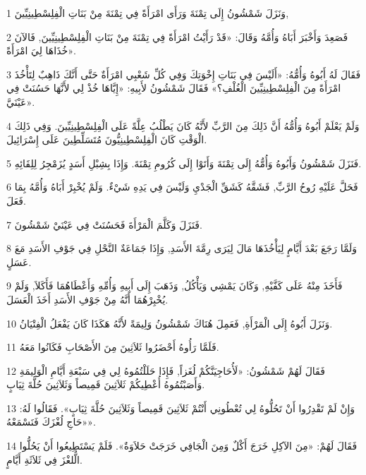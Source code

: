 \par 1 وَنَزَلَ شَمْشُونُ إِلَى تِمْنَةَ وَرَأَى امْرَأَةً فِي تِمْنَةَ مِنْ بَنَاتِ الْفِلِسْطِينِيِّينَ,
\par 2 فَصَعِدَ وَأَخْبَرَ أَبَاهُ وَأُمَّهُ وَقَالَ: «قَدْ رَأَيْتُ امْرَأَةً فِي تِمْنَةَ مِنْ بَنَاتِ الْفِلِسْطِينِيِّينَ, فَالآنَ خُذَاهَا لِيَ امْرَأَةً».
\par 3 فَقَالَ لَهُ أَبُوهُ وَأُمُّهُ: «أَلَيْسَ فِي بَنَاتِ إِخْوَتِكَ وَفِي كُلِّ شَعْبِي امْرَأَةٌ حَتَّى أَنَّكَ ذَاهِبٌ لِتَأْخُذَ امْرَأَةً مِنَ الْفِلِسْطِينِيِّينَ الْغُلْفِ؟» فَقَالَ شَمْشُونُ لأَبِيهِ: «إِيَّاهَا خُذْ لِي لأَنَّهَا حَسُنَتْ فِي عَيْنَيَّ».
\par 4 وَلَمْ يَعْلَمْ أَبُوهُ وَأُمُّهُ أَنَّ ذَلِكَ مِنَ الرَّبِّ لأَنَّهُ كَانَ يَطْلُبُ عِلَّةً عَلَى الْفِلِسْطِينِيِّينَ. وَفِي ذَلِكَ الْوَقْتِ كَانَ الْفِلِسْطِينِيُّونَ مُتَسَلِّطِينَ عَلَى إِسْرَائِيلَ.
\par 5 فَنَزَلَ شَمْشُونُ وَأَبُوهُ وَأُمُّهُ إِلَى تِمْنَةَ وَأَتَوْا إِلَى كُرُومِ تِمْنَةَ. وَإِذَا بِشِبْلِ أَسَدٍ يُزَمْجِرُ لِلِقَائِهِ.
\par 6 فَحَلَّ عَلَيْهِ رُوحُ الرَّبِّ, فَشَقَّهُ كَشَقِّ الْجَدْيِ وَلَيْسَ فِي يَدِهِ شَيْءٌ. وَلَمْ يُخْبِرْ أَبَاهُ وَأُمَّهُ بِمَا فَعَلَ.
\par 7 فَنَزَلَ وَكَلَّمَ الْمَرْأَةَ فَحَسُنَتْ فِي عَيْنَيْ شَمْشُونَ.
\par 8 وَلَمَّا رَجَعَ بَعْدَ أَيَّامٍ لِيَأْخُذَهَا مَالَ لِيَرَى رِمَّةَ الأَسَدِ, وَإِذَا جَمَاعَةٌ النَّحْلِ فِي جَوْفِ الأَسَدِ مَعَ عَسَلٍ.
\par 9 فَأَخَذَ مِنْهُ عَلَى كَفَّيْهِ, وَكَانَ يَمْشِي وَيَأْكُلُ, وَذَهَبَ إِلَى أَبِيهِ وَأُمِّهِ وَأَعْطَاهُمَا فَأَكَلاَ, وَلَمْ يُخْبِرْهُمَا أَنَّهُ مِنْ جَوْفِ الأَسَدِ أَخَذَ الْعَسَلَ.
\par 10 وَنَزَلَ أَبُوهُ إِلَى الْمَرْأَةِ, فَعَمِلَ هُنَاكَ شَمْشُونُ وَلِيمَةً لأَنَّهُ هَكَذَا كَانَ يَفْعَلُ الْفِتْيَانُ.
\par 11 فَلَمَّا رَأُوهُ أَحْضَرُوا ثَلاَثِينَ مِنَ الأَصْحَابِ فَكَانُوا مَعَهُ.
\par 12 فَقَالَ لَهُمْ شَمْشُونُ: «لَأُحَاجِيَنَّكُمْ لُغَزاً, فَإِذَا حَلَلْتُمُوهُ لِي فِي سَبْعَةِ أَيَّامِ الْوَلِيمَةِ وَأَصَبْتُمُوهُ أُعْطِيكُمْ ثَلاَثِينَ قَمِيصاً وَثَلاَثِينَ حُلَّةَ ثِيَابٍ.
\par 13 وَإِنْ لَمْ تَقْدِرُوا أَنْ تَحُلُّوهُ لِي تُعْطُونِي أَنْتُمْ ثَلاَثِينَ قَمِيصاً وَثَلاَثِينَ حُلَّةَ ثِيَابٍ». فَقَالُوا لَهُ: «حَاجِ لُغْزَكَ فَنَسْمَعْهُ».
\par 14 فَقَالَ لَهُمْ: «مِنَ الآكِلِ خَرَجَ أَكْلٌ وَمِنَ الْجَافِي خَرَجَتْ حَلاَوَةٌ». فَلَمْ يَسْتَطِيعُوا أَنْ يَحُلُّوا الُّلغْزَ فِي ثَلاَثَةِ أَيَّامٍ.
